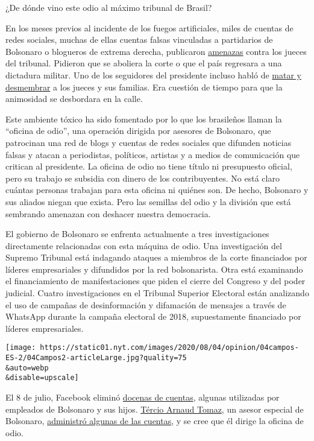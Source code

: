 ¿De dónde vino este odio al máximo tribunal de Brasil?

En los meses previos al incidente de los fuegos artificiales, miles de
cuentas de redes sociales, muchas de ellas cuentas falsas vinculadas a
partidarios de Bolsonaro o blogueros de extrema derecha, publicaron
\href{https://www1.folha.uol.com.br/poder/2020/05/sara-winter-xinga-moraes-diz-querer-trocar-socos-com-ele-e-promete-inferniza-lo.shtml}{amenazas}
contra los jueces del tribunal. Pidieron que se aboliera la corte o que
el país regresara a una dictadura militar. Uno de los seguidores del
presidente incluso habló de
\href{https://g1.globo.com/politica/noticia/2020/06/17/moraes-vota-pela-legalidade-e-continuidade-do-inquerito-das-fake-news.ghtml}{matar
y desmembrar} a los jueces y sus familias. Era cuestión de tiempo para
que la animosidad se desbordara en la calle.

Este ambiente tóxico ha sido fomentado por lo que los brasileños llaman
la ``oficina de odio'', una operación dirigida por asesores de
Bolsonaro, que patrocinan una red de blogs y cuentas de redes sociales
que difunden noticias falsas y atacan a periodistas, políticos, artistas
y a medios de comunicación que critican al presidente. La oficina de
odio no tiene título ni presupuesto oficial, pero su trabajo se subsidia
con dinero de los contribuyentes. No está claro cuántas personas
trabajan para esta oficina ni quiénes son. De hecho, Bolsonaro y sus
aliados niegan que exista. Pero las semillas del odio y la división que
está sembrando amenazan con deshacer nuestra democracia.

El gobierno de Bolsonaro se enfrenta actualmente a tres investigaciones
directamente relacionadas con esta máquina de odio. Una investigación
del Supremo Tribunal está indagando ataques a miembros de la corte
financiados por líderes empresariales y difundidos por la red
bolsonarista. Otra está examinando el financiamiento de manifestaciones
que piden el cierre del Congreso y del poder judicial. Cuatro
investigaciones en el Tribunal Superior Electoral están analizando el
uso de campañas de desinformación y difamación de mensajes a través de
WhatsApp durante la campaña electoral de 2018, supuestamente financiado
por líderes empresariales.

\texttt{[image: https://static01.nyt.com/images/2020/08/04/opinion/04campos-ES-2/04Campos2-articleLarge.jpg?quality=75\\\&auto=webp\\\&disable=upscale]}

El 8 de julio, Facebook eliminó
\href{https://www1.folha.uol.com.br/poder/2020/07/facebook-remove-contas-falsas-ligadas-aos-bolsonaros-e-ao-gabinete-da-presidencia.shtml}{docenas
de cuentas}, algunas utilizadas por empleados de Bolsonaro y sus hijos.
\href{https://elpais.com/internacional/2020-07-10/facebook-rompe-la-oficina-del-odio-una-red-de-88-cuentas-de-apoyo-a-jair-bolsonaro.html}{Tércio
Arnaud Tomaz}, un asesor especial de Bolsonaro,
\href{https://apnews.com/0c58cccec2004bf250c8dab38172cbc9}{administró
algunas de las cuentas}, y se cree que él dirige la oficina de odio.

